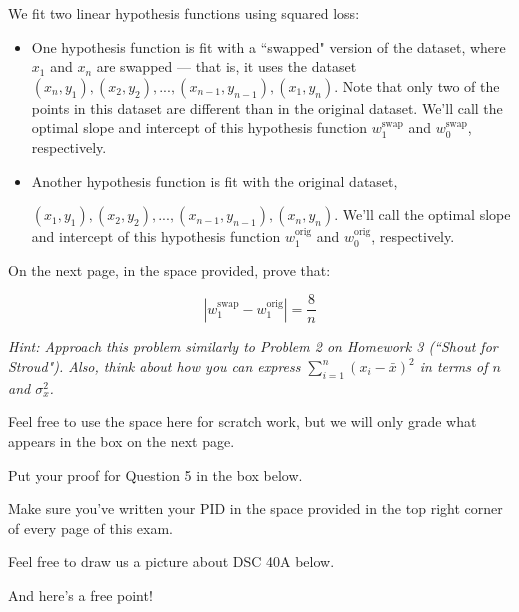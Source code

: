 \documentclass[twoside,12pt]{article}
\begin{document}
\begin{probset}
\begin{prob}[(8 pts)]
We fit two linear hypothesis functions using squared loss:

\begin{itemize}
\item One hypothesis function is fit with a ``swapped" version of the dataset, where $x_1$ and $x_n$ are swapped --- that is, it uses the dataset $(x_n, y_1), (x_2, y_2), ..., (x_{n-1}, y_{n-1}), (x_1, y_n)$. Note that only two of the points in this dataset are different than in the original dataset. We'll call the optimal slope and intercept of this hypothesis function $w_1^\text{swap}$ and $w_0^\text{swap}$, respectively.
\item Another hypothesis function is fit with the original dataset, 

$(x_1, y_1), (x_2, y_2), ..., (x_{n-1}, y_{n-1}), (x_n, y_n)$. We'll call the optimal slope and intercept of this hypothesis function $w_1^\text{orig}$ and $w_0^\text{orig}$, respectively. 
\end{itemize}

On the next page, in the space provided, prove that:

$$\displaystyle | w_1^\text{swap} - w_1^\text{orig} | = \frac{8}{n}$$

\textit{Hint: Approach this problem similarly to Problem 2 on Homework 3 (``Shout for Stroud"). Also, think about how you can express $\sum_{i = 1}^n (x_i - \bar{x})^2$ in terms of $n$ and $\sigma_x^2$.}


\vspace{3.7in}

Feel free to use the space here for scratch work, but we will only grade what appears in the box on the next page.

\newpage

Put your proof for Question 5 in the box below.

\begin{responsebox}{7in}
    
\end{responsebox}
    
\end{prob}

\newpage

Make sure you've written your PID in the space provided in the top right corner of every page of this exam.

Feel free to draw us a picture about DSC 40A below.

And here's a free point!

\begin{responsebox}{7.5in}
    
\end{responsebox}

\end{probset}
\end{document}
